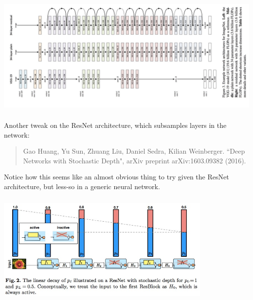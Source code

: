 \documentclass[xetex,mathserif,serif,aspectratio=169]{beamer}
\begin{document}
\begin{frame}[fragile] \frametitle{} \oldB \small

\begin{center}
\includegraphics[width=\textwidth]{img/resNet.jpg}
\end{center}

\end{frame}

\begin{frame}[fragile] \frametitle{} \oldB \small

\textbf{}

\end{frame}

\begin{frame}[fragile] \frametitle{} \oldB \small


Another tweak on the ResNet architecture, which subsamples
layers in the network:
\begin{quote}
Gao Huang, Yu Sun, Zhuang Liu, Daniel Sedra, Kilian Weinberger.
``Deep Networks with Stochastic Depth", arXiv preprint arXiv:1603.09382 (2016).
\end{quote}
Notice how this seems like an almost obvious thing to try
given the ResNet architecture, but less-so in a generic
neural network.

\end{frame}

\begin{frame}[fragile] \frametitle{} \oldB \small

\begin{center}
\includegraphics[width=0.8\textwidth]{img/sampleNet.jpg}
\end{center}

\end{frame}
\end{document}
